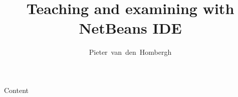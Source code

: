 \documentclass{beamer}
\author[HOM]{Pieter~van~den~Hombergh}
\title{Teaching and \textbf{examining} with NetBeans IDE}
\begin{document}
\frame{\titlepage}
\begin{frame}{Content}
  \tableofcontents
\end{frame}

\end{document}
